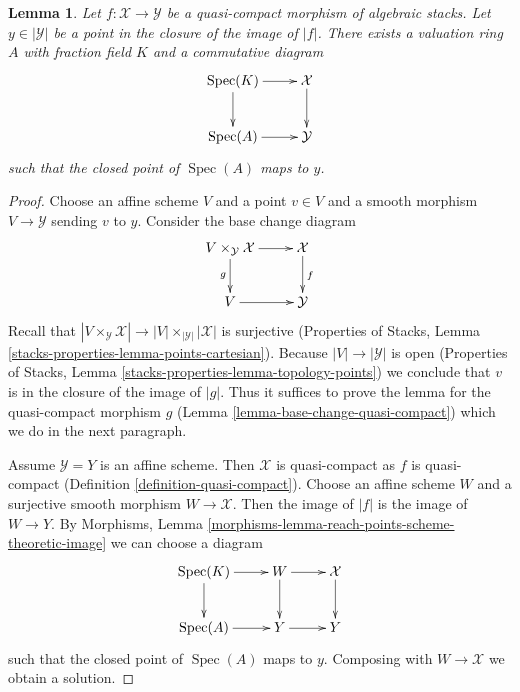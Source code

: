 \documentclass[10pt,a4paper]{amsart}
\theoremstyle{plain}
\newtheorem{lemma}[subsection]{Lemma}
\theoremstyle{definition}
\theoremstyle{remark}
\numberwithin{equation}{subsection}
\def\Spec{\mathop{\mathrm{Spec}}}
\begin{document}
\begin{lemma}
\label{lemma-reach-points-scheme-theoretic-image}
Let $f : \mathcal{X} \to \mathcal{Y}$ be a quasi-compact morphism of
algebraic stacks. Let $y \in |\mathcal{Y}|$ be a point in the closure
of the image of $|f|$. There exists a valuation ring $A$ with
fraction field $K$ and a commutative diagram
$$
\xymatrix{
\Spec(K) \ar[r] \ar[d] & \mathcal{X} \ar[d] \\
\Spec(A) \ar[r] & \mathcal{Y}
}
$$
such that the closed point of $\Spec(A)$ maps to $y$.
\end{lemma}

\begin{proof}
Choose an affine scheme $V$ and a point $v \in V$ and a smooth morphism
$V \to \mathcal{Y}$ sending $v$ to $y$. Consider the base change diagram
$$
\xymatrix{
V \times_\mathcal{Y} \mathcal{X} \ar[r] \ar[d]_g & \mathcal{X} \ar[d]^f \\
V \ar[r] & \mathcal{Y}
}
$$
Recall that $|V \times_\mathcal{Y} \mathcal{X}| \to
|V| \times_{|\mathcal{Y}|} |\mathcal{X}|$ is surjective
(Properties of Stacks, Lemma \ref{stacks-properties-lemma-points-cartesian}).
Because $|V| \to |\mathcal{Y}|$ is open
(Properties of Stacks, Lemma \ref{stacks-properties-lemma-topology-points})
we conclude that $v$ is in the closure of the image of $|g|$.
Thus it suffices to prove the lemma for the quasi-compact morphism $g$
(Lemma \ref{lemma-base-change-quasi-compact}) which we do in the next
paragraph.

\medskip\noindent
Assume $\mathcal{Y} = Y$ is an affine scheme. Then $\mathcal{X}$
is quasi-compact as $f$ is quasi-compact
(Definition \ref{definition-quasi-compact}).
Choose an affine scheme $W$ and a surjective smooth morphism
$W \to \mathcal{X}$. Then the image of $|f|$ is the image
of $W \to Y$.
By Morphisms, Lemma \ref{morphisms-lemma-reach-points-scheme-theoretic-image}
we can choose a diagram
$$
\xymatrix{
\Spec(K) \ar[r] \ar[d] & W \ar[d] \ar[r] & \mathcal{X} \ar[d] \\
\Spec(A) \ar[r] & Y \ar[r] & Y
}
$$
such that the closed point of $\Spec(A)$ maps to $y$.
Composing with $W \to \mathcal{X}$ we obtain a solution.
\end{proof}
\end{document}
